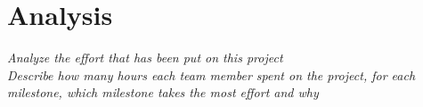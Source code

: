 
\section{Analysis}\label{sec:analysis}
    \emph{Analyze the effort that has been put on this project} \\
    \emph{Describe how many hours each team member spent on the project, for each milestone, which milestone takes the most effort and why}